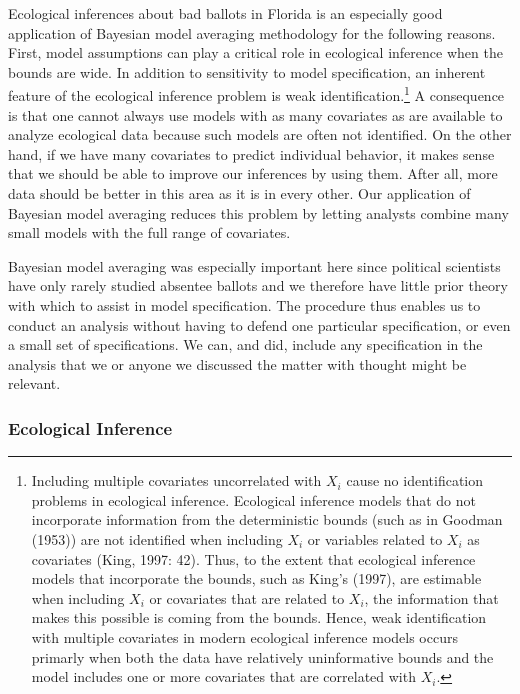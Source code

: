 \documentclass[11pt,titlepage]{article}
\begin{document}
Ecological inferences about bad ballots in Florida is an especially
good application of Bayesian model averaging methodology for the
following reasons.  First, model assumptions can play a critical role
in ecological inference when the bounds are wide.  In addition to
sensitivity to model specification, an inherent feature of the
ecological inference problem is weak
identification.\footnote{Including multiple covariates uncorrelated
  with $X_i$ cause no identification problems in ecological inference.
  Ecological inference models that do not incorporate information from
  the deterministic bounds (such as in Goodman
  (1953)\nocite{goodman53}) are not identified when including $X_i$ or
  variables related to $X_i$ as covariates (King, 1997: 42).  Thus, to
  the extent that ecological inference models that incorporate the
  bounds, such as King's (1997), are estimable when including $X_i$ or
  covariates that are related to $X_i$, the information that makes
  this possible is coming from the bounds.  Hence, weak identification
  with multiple covariates in modern ecological inference models
  occurs primarly when both the data have relatively uninformative
  bounds and the model includes one or more covariates that are
  correlated with $X_i$.}  A consequence is that one cannot always use
models with as many covariates as are available to analyze ecological
data because such models are often not identified.  On the other hand,
if we have many covariates to predict individual behavior, it makes
sense that we should be able to improve our inferences by using them.
After all, more data should be better in this area as it is in every
other.  Our application of Bayesian model averaging reduces this
problem by letting analysts combine many small models with the full
range of covariates.

Bayesian model averaging was especially important here since political
scientists have only rarely studied absentee ballots and we therefore
have little prior theory with which to assist in model specification.
The procedure thus enables us to conduct an analysis without having to
defend one particular specification, or even a small set of
specifications.  We can, and did, include any specification in the
analysis that we or anyone we discussed the matter with thought might
be relevant.

\subsubsection{Ecological Inference}
\end{document}
